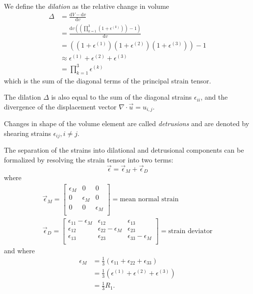 We define the \textit{dilation} as the relative change in volume
\begin{align*}
  \Delta &= \frac{\mathrm{d}V - \mathrm{d}v}{\mathrm{d}v} \\
  &= \frac{\mathrm{d}v \left( \left( \prod_{k = 1}^{3} \left( 1 + \epsilon^{(k)} \right) \right) - 1 \right)}{\mathrm{d}v} \\
  &= \left( \left( 1 + \epsilon^{(1)} \right)\left( 1 + \epsilon^{(2)} \right) \left( 1 + \epsilon^{(3)} \right) \right) - 1 \\
  &\approx \epsilon^{(1)} + \epsilon^{(2)} + \epsilon^{(3)} \\
  &= \prod_{k = 1}^{3} \epsilon^{(k)}
\end{align*}
which is the sum of the diagonal terms of the principal strain tensor.

The dilation $\Delta$ is also equal to the sum of the diagonal strains $\epsilon_{ii}$, and the divergence of the displacement vector $\nabla  \cdot \Vec{u} = u_{i,j}$.

Changes in shape of the volume element are called \textit{detrusions} and are denoted by shearing strains $\epsilon_{ij}, i \neq j$.

The separation of the strains into dilational and detrusional components can be formalized by resolving the strain tensor into two terms:
\begin{equation*}
  \Vec{\epsilon} = \Vec{\epsilon}_M + \Vec{\epsilon}_D
\end{equation*}
where
\begin{gather*}
  \Vec{\epsilon}_M = \begin{bmatrix}
    \epsilon_M & 0 & 0\\
  0 & \epsilon_M & 0\\
  0 & 0 & \epsilon_M\\
  \end{bmatrix} = \text{mean normal strain} \\
  \Vec{\epsilon}_D = \begin{bmatrix}
    \epsilon_{11} - \epsilon_M & \epsilon_{12} & \epsilon_{13}\\
  \epsilon_{12} & \epsilon_{22} - \epsilon_M & \epsilon_{23}\\
  \epsilon_{13} & \epsilon_{23} & \epsilon_{33} - \epsilon_M\\
  \end{bmatrix} = \text{strain deviator}
\end{gather*}
and where
\begin{align*}
  \epsilon_M &= \frac{1}{3} \left( \epsilon_{11} + \epsilon_{22} + \epsilon_{33} \right) \\
  &= \frac{1}{3} \left( \epsilon^{(1)} + \epsilon^{(2)} + \epsilon^{(3)} \right) \\
  &= \frac{1}{3} R_1
.\end{align*}

